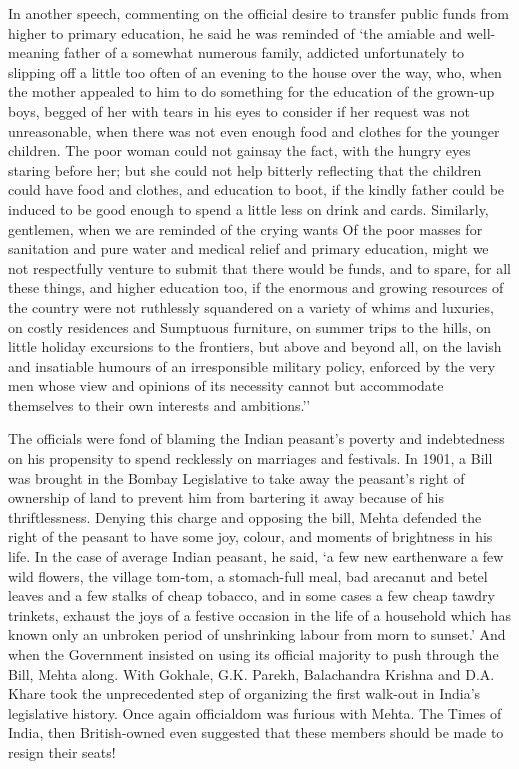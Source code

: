 \begin{multicols}{2}
In another speech, commenting on the official desire to transfer public funds from higher to primary education, he said he was reminded of `the amiable and well-meaning father of a somewhat numerous family, addicted unfortunately to slipping off a little too often of an evening to the house over the way, who, when the mother appealed to him to do something for the education of the grown-up boys, begged of her with tears in his eyes to consider if her request was not unreasonable, when there was not even enough food and clothes for the younger children. The poor woman could not gainsay the fact, with the hungry eyes staring before her; but she could not help bitterly reflecting that the children could have food and clothes, and education to boot, if the kindly father could be induced to be good enough to spend a little less on drink and cards. Similarly, gentlemen, when we are reminded of the crying wants Of the poor masses for sanitation and pure water and medical relief and primary education, might we not respectfully venture to submit that there would be funds, and to spare, for all these things, and higher education too, if the enormous and growing resources of the country were not ruthlessly squandered on a variety of whims and luxuries, on costly residences and Sumptuous furniture, on summer trips to the hills, on little holiday excursions to the frontiers, but above and beyond all, on the lavish and insatiable humours of an irresponsible military policy, enforced by the very men whose view and opinions of its necessity cannot but accommodate themselves to their own interests and ambitions.''

The officials were fond of blaming the Indian peasant's poverty and indebtedness on his propensity to spend recklessly on marriages and festivals. In 1901, a Bill was brought in the Bombay Legislative to take away the peasant's right of ownership of land to prevent him from bartering it away because of his thriftlessness. Denying this charge and opposing the bill, Mehta defended the right of the peasant to have some joy, colour, and moments of brightness in his life. In the case of average Indian peasant, he said, `a few new earthenware a few wild flowers, the village tom-tom, a stomach-full meal, bad arecanut and betel leaves and a few stalks of cheap tobacco, and in some cases a few cheap tawdry trinkets, exhaust the joys of a festive occasion in the life of a household which has known only an unbroken period of unshrinking labour from morn to sunset.' And when the Government insisted on using its official majority to push through the Bill, Mehta along. With Gokhale, G.K. Parekh, Balachandra Krishna and D.A. Khare took the unprecedented step of organizing the first walk-out in India's legislative history. Once again officialdom was furious with Mehta. The Times of India, then British-owned even suggested that these members should be made to resign their seats!


\end{multicols}
